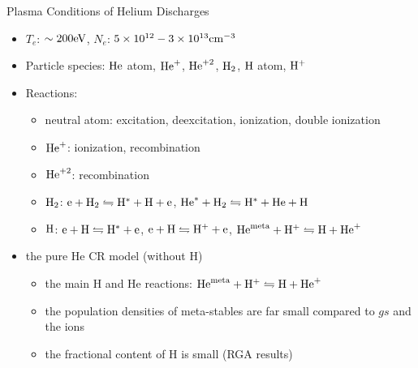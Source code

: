 \begin{CJK*}{UTF8}{kai}
\begin{frame}{Plasma Conditions of Helium Discharges}
	\begin{itemize}
		\item $T_e$: $\sim 200\rm{eV}$, $N_e$: $5\times 10^{12}-3\times 10^{13}\rm{cm}^{-3}$
		\item Particle species: $\rm{He}$ atom, $\rm{He}^+$, $\rm{He}^{+2}$, $\rm{H}_2$, $\rm{H}$ atom, $\rm{H}^+$
		\item Reactions:
			\begin{itemize}
				\item neutral atom: excitation, deexcitation, ionization, double ionization
				\item $\rm{He}^+$: ionization, recombination
				\item $\rm{He}^{+2}$: recombination
				\item $\rm{H}_2$: $\rm{e}+\rm{H}_2\leftrightharpoons\rm{H}^*+\rm{H}+\rm{e}$,
					$\rm{He}^*+\rm{H}_2\leftrightharpoons\rm{H}^*+\rm{He}+\rm{H}$
				\item $\rm{H}$: $\rm{e}+\rm{H}\leftrightharpoons\rm{H}^*+\rm{e}$,
					$\rm{e}+\rm{H}\leftrightharpoons\rm{H}^++\rm{e}$,
					$\rm{He}^{\rm meta}+\rm{H}^+\leftrightharpoons\rm{H}+\rm{He}^+$
			\end{itemize}
        \item the pure He CR model (without H)
            \begin{itemize}
              \item the main H and He reactions: $\rm{He}^{\rm meta}+\rm{H}^+\leftrightharpoons\rm{H}+\rm{He}^+$
              \item the population densities of meta-stables are far small compared to $gs$ and the ions
              \item the fractional content of H is small (RGA results)
            \end{itemize}
	\end{itemize}
\end{frame}


\end{CJK*}
